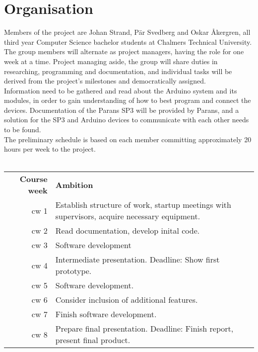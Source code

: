 \documentclass[a4paper]{article}
\begin{document}
   \section*{Organisation} %
	\label{sec:organisation}
		Members of the project are Johan Strand, Pär Svedberg and Oskar Åkergren, all third year Computer Science bachelor students at Chalmers Technical University. The group members will alternate as project managers, having the role for one week at a time. Project managing aside, the group will share duties in researching, programming and documentation, and individual tasks will be derived from the project's milestones and democratically assigned. \\

		\noindent Information need to be gathered and read about the Arduino system and its modules, in order to gain understanding of how to best program and connect the devices. Documentation of the Parans SP3 will be provided by Parans, and a solution for the SP3 and Arduino devices to communicate with each other needs to be found. \\
		
		\noindent The preliminary schedule is based on each member committing approximately 20 hours per week to the project.
		\\ \\
		\noindent\begin{tabularx}{\textwidth}{@{}rX}
			\textbf{Course week} & \textbf{Ambition}\\
			cw 1 & Establish structure of work, startup meetings with supervisors, acquire necessary equipment. \\
			cw 2 & Read documentation, develop inital code. \\
			cw 3 & Software development \\
			cw 4 & Intermediate presentation. Deadline: Show first prototype. \\
			cw 5 & Software development. \\
			cw 6 & Consider inclusion of additional features. \\
			cw 7 & Finish software development. \\
			cw 8 & Prepare final presentation. Deadline: Finish report, present final product. \\
		\end{tabularx}
\end{document}
